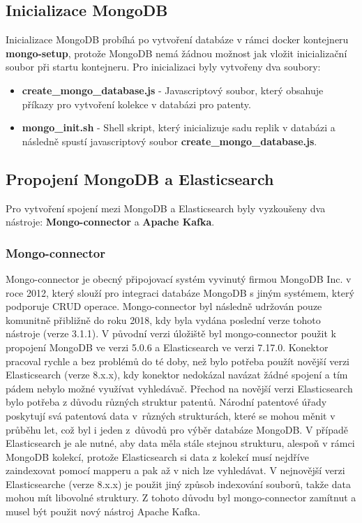\subsection{Inicializace MongoDB}
Inicializace MongoDB probíhá po vytvoření databáze v rámci docker kontejneru \textbf{mongo-setup}, protože MongoDB nemá žádnou možnost jak vložit inicializační soubor při startu kontejneru. Pro inicializaci byly vytvořeny dva soubory:
\begin{itemize}
\item \textbf{create\_mongo\_database.js} - Javascriptový soubor, který obsahuje příkazy pro vytvoření kolekce v databázi pro patenty.
\item \textbf{mongo\_init.sh} - Shell skript, který inicializuje sadu replik v databázi a následně spustí javascriptový soubor \textbf{create\_mongo\_database.js}.
\end{itemize}

\subsection{Propojení MongoDB a Elasticsearch}
Pro vytvoření spojení mezi MongoDB a Elasticsearch byly vyzkoušeny dva nástroje: \textbf{Mongo-connector} a \textbf{Apache Kafka}. 

\subsubsection{Mongo-connector}
Mongo-connector je obecný připojovací systém vyvinutý firmou MongoDB Inc. v roce 2012, který slouží pro integraci databáze MongoDB s jiným systémem, který podporuje \gls{CRUD} operace. Mongo-connector byl následně udržován pouze komunitně přibližně do roku 2018, kdy byla vydána poslední verze tohoto nástroje (verze 3.1.1).
\newline
\indent V původní verzi úložiště byl mongo-connector použit k propojení MongoDB ve verzi 5.0.6 a Elasticsearch ve verzi 7.17.0. Konektor pracoval rychle a bez problémů do té doby, než bylo potřeba použít novější verzi Elasticsearch (verze 8.x.x), kdy konektor nedokázal navázat žádné spojení a tím pádem nebylo možné využívat vyhledávač.
\newline
\indent Přechod na novější verzi Elasticsearch bylo potřeba z důvodu různých struktur patentů. Národní patentové úřady poskytují svá patentová data v~různých strukturách, které se mohou měnit v průběhu let, což byl i jeden z~důvodů pro výběr databáze MongoDB. V případě Elasticsearch je ale nutné, aby data měla stále stejnou strukturu, alespoň v rámci MongoDB kolekcí, protože Elasticsearch si data z kolekcí musí nejdříve zaindexovat pomocí mapperu a pak až v nich lze vyhledávat. V nejnovější verzi Elasticsearche (verze 8.x.x) je použit jiný způsob indexování souborů, takže data mohou mít libovolné struktury. Z tohoto důvodu byl mongo-connector zamítnut a musel být použit nový nástroj Apache Kafka.

